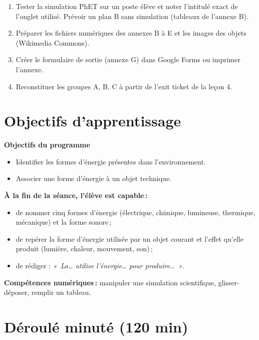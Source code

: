\documentclass[11pt,a4paper]{article}
\begin{document}
\begin{astuce}
\begin{enumerate}
 \item Tester la simulation PhET sur un poste élève et noter l'intitulé exact de l'onglet utilisé. Prévoir un plan B sans simulation (tableaux de l'annexe B).
 \item Préparer les fichiers numériques des annexes B à E et les images des objets (Wikimedia Commons).
 \item Créer le formulaire de sortie (annexe G) dans Google Forms ou imprimer l'annexe.
 \item Reconstituer les groupes A, B, C à partir de l'exit ticket de la leçon 4.
\end{enumerate}
\end{astuce}

\section{Objectifs d'apprentissage}
\begin{tcolorbox}[colback=gray!8,colframe=gray!60!black,arc=1mm,boxrule=0.5pt]
\textbf{Objectifs du programme}
\begin{itemize}
 \item Identifier les formes d'énergie présentes dans l'environnement.
 \item Associer une forme d'énergie à un objet technique.
\end{itemize}
\textbf{À la fin de la séance, l'élève est capable\,:}
\begin{itemize}
 \item de nommer cinq formes d'énergie (électrique, chimique, lumineuse, thermique, mécanique) et la forme sonore\,;
 \item de repérer la forme d'énergie utilisée par un objet courant et l'effet qu'elle produit (lumière, chaleur, mouvement, son)\,;
 \item de rédiger : \textit{«~La\ldots{} utilise l'énergie\ldots{} pour produire\ldots~»}.
\end{itemize}
\textbf{Compétences numériques\,:} manipuler une simulation scientifique, glisser-déposer, remplir un tableau.
\end{tcolorbox}

\section{Déroulé minuté (120 min)}
\end{document}
